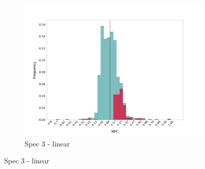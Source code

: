 \begin{figure}[t]
\begin{subfigure}{0.33\linewidth}
        \includegraphics[width=\linewidth]{figures/distributions/spec3_lin_chFDexp.png}
        \caption{Spec 3 - linear}
    \end{subfigure}\hfill
    

\end{figure}
